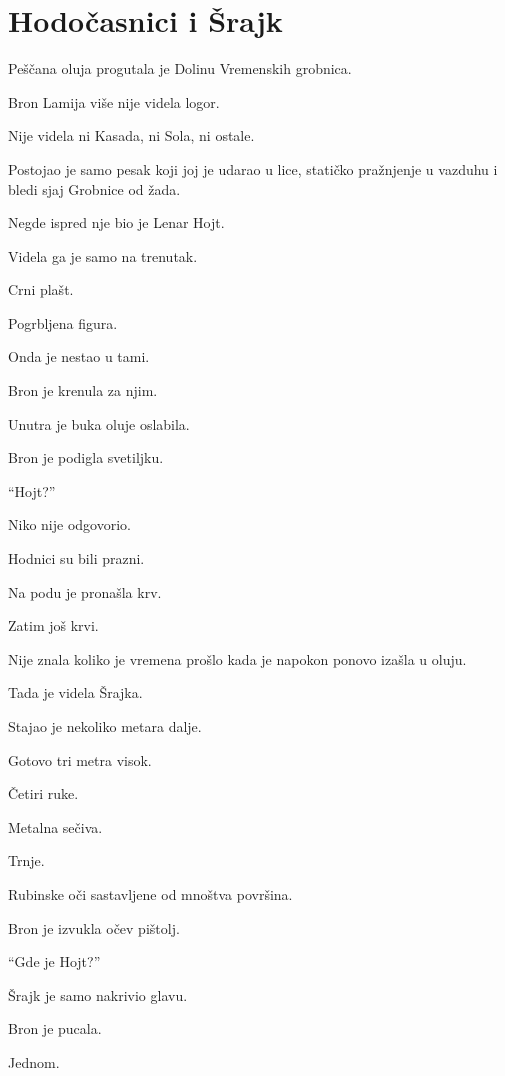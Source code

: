 
\chapter{Hodočasnici i Šrajk}


Peščana oluja progutala je Dolinu Vremenskih grobnica.

Bron Lamija više nije videla logor.

Nije videla ni Kasada, ni Sola, ni ostale.

Postojao je samo pesak koji joj je udarao u lice, statičko pražnjenje u vazduhu i bledi sjaj Grobnice od žada.

Negde ispred nje bio je Lenar Hojt.

Videla ga je samo na trenutak.

Crni plašt.

Pogrbljena figura.

Onda je nestao u tami.

Bron je krenula za njim.

\bigskip

Unutra je buka oluje oslabila.

Bron je podigla svetiljku.

``Hojt?''

Niko nije odgovorio.

Hodnici su bili prazni.

Na podu je pronašla krv.

Zatim još krvi.

Nije znala koliko je vremena prošlo kada je napokon ponovo izašla u oluju.

Tada je videla Šrajka.

Stajao je nekoliko metara dalje.

Gotovo tri metra visok.

Četiri ruke.

Metalna sečiva.

Trnje.

Rubinske oči sastavljene od mnoštva površina.

Bron je izvukla očev pištolj.

``Gde je Hojt?''

Šrajk je samo nakrivio glavu.

Bron je pucala.

Jednom.

